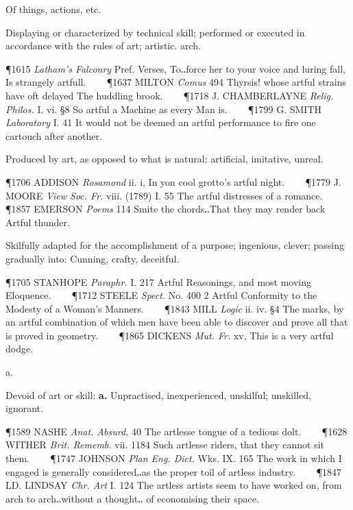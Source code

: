 \begin{description}[wide, labelwidth=!, labelindent=0pt]
\begin{myenumerate}
 Of things, actions, etc.

 Displaying or characterized by technical skill; performed or executed in accordance with the rules of art; artistic. arch.

\P 1615 \textit{Latham's Falconry} Pref. Verses, To‥force her to your voice and luring fall, Is strangely artfull.    
\P 1637 MILTON  \textit{Comus} 494 Thyrsis! whose artful strains have oft delayed The huddling brook.    
\P 1718 J. CHAMBERLAYNE  \textit{Relig. Philos.} I. vi. §8 So artful a Machine as every Man is.    
\P 1799 G. SMITH  \textit{Laboratory} I. 41 It would not be deemed an artful performance to fire one cartouch after another.

 Produced by art, as opposed to what is natural; artificial, imitative, unreal.

\P 1706 ADDISON  \textit{Rosamond} ii. i, In yon cool grotto's artful night.    
\P 1779 J. MOORE  \textit{View Soc. Fr.} viii. (1789) I. 55 The artful distresses of a romance.    
\P 1857 EMERSON  \textit{Poems} 114 Smite the chords‥That they may render back Artful thunder.

 Skilfully adapted for the accomplishment of a purpose; ingenious, clever; passing gradually into: Cunning, crafty, deceitful.

\P 1705 STANHOPE  \textit{Paraphr.} I. 217 Artful Reasonings, and most moving Eloquence.    
\P 1712 STEELE  \textit{Spect.} No. 400 2 Artful Conformity to the Modesty of a Woman's Manners.    
\P 1843 MILL  \textit{Logic} ii. iv. §4 The marks, by an artful combination of which men have been able to discover and prove all that is proved in geometry.    
\P 1865 DICKENS  \textit{Mut. Fr.} xv, This is a very artful dodge.
\end{myenumerate}


 a.

\noindent {}

\vspace{-0.3cm}

\begin{myenumerate}

 Devoid of art or skill: \textbf{a.} Unpractised, inexperienced, unskilful; unskilled, ignorant.

\P 1589 NASHE  \textit{Anat. Absurd.} 40 The artlesse tongue of a tedious dolt.    
\P 1628 WITHER  \textit{Brit. Rememb.} vii. 1184 Such artlesse riders, that they cannot sit them.    
\P 1747 JOHNSON  \textit{Plan Eng. Dict.} Wks. IX. 165 The work in which I engaged is generally considered‥as the proper toil of artless industry.    
\P 1847 LD. LINDSAY  \textit{Chr. Art} I. 124 The artless artists seem to have worked on, from arch to arch‥without a thought‥ of economising their space.


\end{myenumerate}
\end{description}
